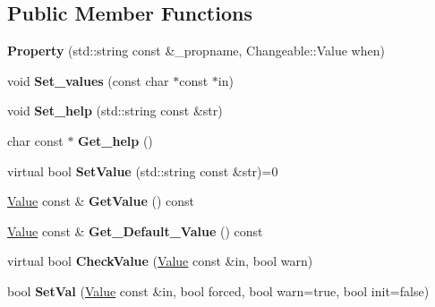 \subsection*{Public Member Functions}
\begin{DoxyCompactItemize}
\item 
\hypertarget{classProperty_ab65733010b8ea50392b4ea43536c0008}{{\bfseries Property} (std\-::string const \&\-\_\-propname, Changeable\-::\-Value when)}\label{classProperty_ab65733010b8ea50392b4ea43536c0008}

\item 
\hypertarget{classProperty_ae192c83aeb5086ca074c4daa85007de2}{void {\bfseries Set\-\_\-values} (const char $\ast$const $\ast$in)}\label{classProperty_ae192c83aeb5086ca074c4daa85007de2}

\item 
\hypertarget{classProperty_a023caf411f40d81346633b68cf83693d}{void {\bfseries Set\-\_\-help} (std\-::string const \&str)}\label{classProperty_a023caf411f40d81346633b68cf83693d}

\item 
\hypertarget{classProperty_a83a01588ef9bc4b9e3cd5faf57649013}{char const $\ast$ {\bfseries Get\-\_\-help} ()}\label{classProperty_a83a01588ef9bc4b9e3cd5faf57649013}

\item 
\hypertarget{classProperty_ab36313503e43bc6c1294c23d5dba323f}{virtual bool {\bfseries Set\-Value} (std\-::string const \&str)=0}\label{classProperty_ab36313503e43bc6c1294c23d5dba323f}

\item 
\hypertarget{classProperty_a8972c72f3a4d10e20782cb7dc7800bea}{\hyperlink{classValue}{Value} const \& {\bfseries Get\-Value} () const }\label{classProperty_a8972c72f3a4d10e20782cb7dc7800bea}

\item 
\hypertarget{classProperty_a665dc0efff99aa4e29162bf87b287f9b}{\hyperlink{classValue}{Value} const \& {\bfseries Get\-\_\-\-Default\-\_\-\-Value} () const }\label{classProperty_a665dc0efff99aa4e29162bf87b287f9b}

\item 
\hypertarget{classProperty_a916d05a8fb70701e54d391d737d19209}{virtual bool {\bfseries Check\-Value} (\hyperlink{classValue}{Value} const \&in, bool warn)}\label{classProperty_a916d05a8fb70701e54d391d737d19209}

\item 
\hypertarget{classProperty_a44cd119ea8457d7d2e637916f079eb46}{bool {\bfseries Set\-Val} (\hyperlink{classValue}{Value} const \&in, bool forced, bool warn=true, bool init=false)}\label{classProperty_a44cd119ea8457d7d2e637916f079eb46}


\end{DoxyCompactItemize}
